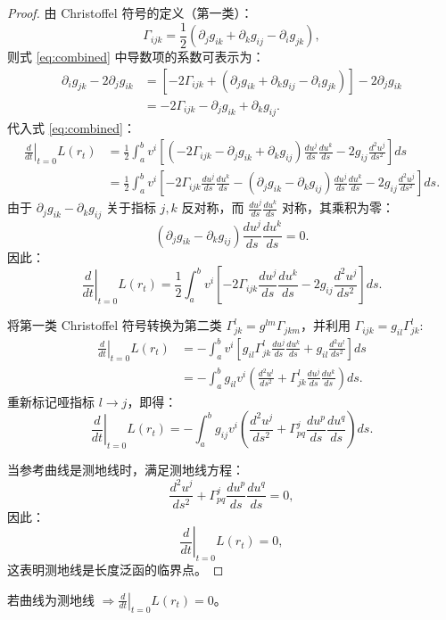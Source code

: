 \documentclass[lang=cn,10pt,thmcnt=section]{elegantbook}
\begin{document}
\begin{proof}
    由 Christoffel 符号的定义（第一类）：
    \[
    \Gamma_{ijk} = \frac{1}{2} \left( \partial_j g_{ik} + \partial_k g_{ij} - \partial_i g_{jk} \right),
    \]
    则式 \eqref{eq:combined} 中导数项的系数可表示为：
    \begin{align*}
        \partial_i g_{jk} - 2 \partial_j g_{ik} 
        &= \left[ -2 \Gamma_{ijk} + (\partial_j g_{ik} + \partial_k g_{ij} - \partial_i g_{jk}) \right] - 2 \partial_j g_{ik} \\
        &= -2 \Gamma_{ijk} - \partial_j g_{ik} + \partial_k g_{ij}.
    \end{align*}
    代入式 \eqref{eq:combined}：
    \begin{align*}
        \left. \frac{d}{dt} \right|_{t=0} L(r_t) 
        &= \frac{1}{2} \int_a^b v^i \left[ \left( -2 \Gamma_{ijk} - \partial_j g_{ik} + \partial_k g_{ij} \right) \frac{du^j}{ds} \frac{du^k}{ds} - 2 g_{ij} \frac{d^2 u^j}{ds^2} \right] ds \\
        &= \frac{1}{2} \int_a^b v^i \left[ -2 \Gamma_{ijk} \frac{du^j}{ds} \frac{du^k}{ds} - (\partial_j g_{ik} - \partial_k g_{ij}) \frac{du^j}{ds} \frac{du^k}{ds} - 2 g_{ij} \frac{d^2 u^j}{ds^2} \right] ds.
    \end{align*}
    由于 \( \partial_j g_{ik} - \partial_k g_{ij} \) 关于指标 \( j,k \) 反对称，而 \( \frac{du^j}{ds} \frac{du^k}{ds} \) 对称，其乘积为零：
    \[
    (\partial_j g_{ik} - \partial_k g_{ij}) \frac{du^j}{ds} \frac{du^k}{ds} = 0.
    \]
    因此：
    \[
    \left. \frac{d}{dt} \right|_{t=0} L(r_t) = \frac{1}{2} \int_a^b v^i \left[ -2 \Gamma_{ijk} \frac{du^j}{ds} \frac{du^k}{ds} - 2 g_{ij} \frac{d^2 u^j}{ds^2} \right] ds.
    \]
    
    将第一类 Christoffel 符号转换为第二类 \( \Gamma_{jk}^l = g^{lm} \Gamma_{jkm} \)，并利用 \( \Gamma_{ijk} = g_{il} \Gamma_{jk}^l \):
    \begin{align*}
        \left. \frac{d}{dt} \right|_{t=0} L(r_t) 
        &= -\int_a^b v^i \left[ g_{il} \Gamma_{jk}^l \frac{du^j}{ds} \frac{du^k}{ds} + g_{il} \frac{d^2 u^l}{ds^2} \right] ds \\
        &= -\int_a^b g_{il} v^i \left( \frac{d^2 u^l}{ds^2} + \Gamma_{jk}^l \frac{du^j}{ds} \frac{du^k}{ds} \right) ds.
    \end{align*}
    重新标记哑指标 \( l \to j \)，即得：
    \[
    \left. \frac{d}{dt} \right|_{t=0} L(r_t) = -\int_a^b g_{ij} v^i \left( \frac{d^2 u^j}{ds^2} + \Gamma^j_{pq} \frac{du^p}{ds} \frac{du^q}{ds} \right) ds.
    \]
    
    当参考曲线是测地线时，满足测地线方程：
    \[
    \frac{d^2 u^j}{ds^2} + \Gamma^j_{pq} \frac{du^p}{ds} \frac{du^q}{ds} = 0,
    \]
    因此：
    \[
    \left. \frac{d}{dt} \right|_{t=0} L(r_t) = 0,
    \]
    这表明测地线是长度泛函的临界点。
\end{proof}
\begin{corollary}
    若曲线为测地线 \(\Rightarrow \left. \frac{d}{dt} \right|_{t=0} L(r_t) = 0\)。
\end{corollary}
\end{document}
